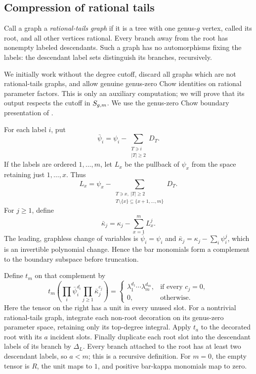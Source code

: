 \subsection{Compression of rational tails}

Call a graph a \emph{rational-tails graph} if it is a tree with one
genus-\(g\) vertex, called its root, and all other vertices rational.
Every branch away from the root has nonempty labeled descendants.
Such a graph has no automorphisms fixing the labels: the descendant
label sets distinguish its branches, recursively.

We initially work without the degree cutoff, discard all graphs
which are not rational-tails graphs, and allow genuine genus-zero
Chow identities on rational parameter factors.  This is only an
auxiliary computation; we will prove that its output respects the
cutoff in \(S_{g,m}\). We use the genus-zero Chow boundary
presentation of \cite[Section~4, Theorem~1]{Keel1992}.

For each label \(i\), put
\[
 \bar\psi_i=\psi_i-\sum_{\substack{T\ni i\\ |T|\geq2}}D_T.
\]
If the labels are ordered \(1,\ldots,m\), let \(L_x\) be the
pullback of \(\psi_x\) from the space retaining just
\(1,\ldots,x\).  Thus
\[
 L_x=\psi_x-
 \sum_{\substack{T\ni x,\ |T|\geq2\\T\setminus\{x\}\subseteq\{x+1,\ldots,m\}}}
 D_T.
\]
For \(j\geq1\), define
\[
 \bar\kappa_j=\kappa_j-\sum_{x=1}^m L_x^j.
\]
The leading, graphless change of variables is
\(\bar\psi_i=\psi_i\) and
\(\bar\kappa_j=\kappa_j-\sum_i\psi_i^j\), which is an invertible
polynomial change.  Hence the bar monomials form a complement to
the boundary subspace before truncation.

Define \(t_m\) on that complement by
\begin{equation}
 t_m\left(\prod_i\bar\psi_i^{d_i}
                 \prod_{j\geq1}\bar\kappa_j^{c_j}\right)
 =
 \begin{cases}
   \lambda_1^{d_1}\cdots\lambda_m^{d_m},
      &\text{if every }c_j=0,\\
   0,&\text{otherwise}.
 \end{cases}
 \label{eq:detector-prescription}
\end{equation}
Here the tensor on the right has a unit in every unused slot.
For a nontrivial rational-tails graph, integrate each non-root
decoration on its genus-zero parameter space, retaining only its
top-degree integral.  Apply \(t_a\) to the decorated root with its
\(a\) incident slots.  Finally duplicate each root slot into the
descendant labels of its branch by \(\Delta_L\).
Every branch attached to the root has at least two descendant
labels, so \(a<m\); this is a recursive definition.  For \(m=0\),
the empty tensor is \(R\), the unit maps to \(1\), and positive
bar-kappa monomials map to zero.

